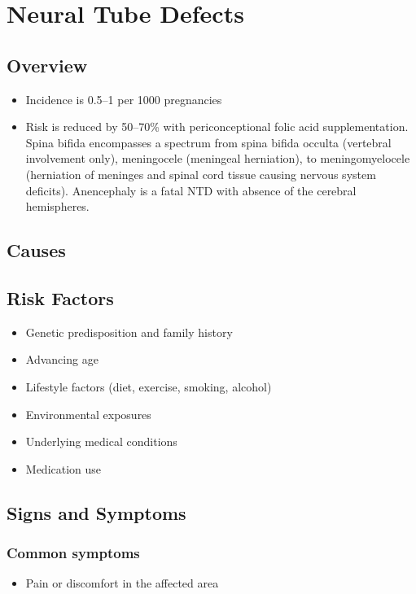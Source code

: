 \chapter{Neural Tube Defects}
\label{sec:Neural Tube Defects}

\section{Overview}


\begin{itemize}[noitemsep]
  \item Incidence is 0.5--1 per 1000 pregnancies
  \item Risk is reduced by 50--70\% with periconceptional folic acid supplementation. Spina bifida encompasses a spectrum from spina bifida occulta (vertebral involvement only), meningocele (meningeal herniation), to meningomyelocele (herniation of meninges and spinal cord tissue causing nervous system deficits). Anencephaly is a fatal NTD with absence of the cerebral hemispheres.
\end{itemize}
\section{Causes}
\section{Risk Factors}

\begin{itemize}[noitemsep]
  \item Genetic predisposition and family history
  \item Advancing age
  \item Lifestyle factors (diet, exercise, smoking, alcohol)
  \item Environmental exposures
  \item Underlying medical conditions
  \item Medication use
\end{itemize}
\section{Signs and Symptoms}

\subsection{Common symptoms}
\begin{itemize}[noitemsep]
  \item Pain or discomfort in the affected area
  \end{itemize}


